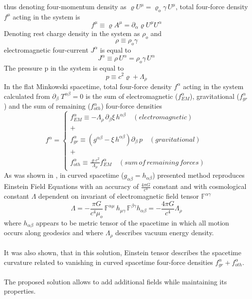 \documentclass[aps,prx,preprint,groupedaddress,showkeys]{revtex4-2}
\begin{document}
thus denoting four-momentum density as $\varrho U^{\mu} = \varrho_o \gamma \, U^{\mu}$, total four-force density $f^{\mu}$ acting in the system is
\begin{equation} \label{TotFoI}
f^{\mu} \equiv \varrho A^{\mu} = \partial_{\alpha} \varrho U^{\mu} U^{\alpha}
\end{equation}
Denoting rest charge density in the system as $ \rho_o$ and
\begin{equation} \label{RHZERO}
\rho \equiv \rho_o \gamma
\end{equation}
electromagnetic four-current $J^{\alpha}$ is equal to
\begin{equation} \label{EN11}
J^{\alpha} \equiv \rho \, U^{\alpha} = \rho_o \gamma \, U^{\alpha}
\end{equation}
The pressure p in the system is equal to
\begin{equation} \label{Pressure}
p \equiv c^2 \varrho +  \Lambda_{\rho}
\end{equation}
In the flat Minkowski spacetime, total four-force density $f^{\alpha}$ acting in the system calculated from $\partial_{\beta} \; T^{\alpha \beta} =0$ is the sum of electromagnetic ($f^{\alpha}_{EM}$), gravitational ($f^{\alpha}_{gr}$) and the sum of remaining ($f^{\alpha}_{oth}$) four-force densities
\begin{equation} \label{forceDen}
f^{\alpha} = 
\begin{cases} 
f^{\alpha}_{EM} \equiv -\Lambda_{\rho} \, \partial_{\beta} \xi \, h^{\alpha \beta} \quad (electromagnetic) \\
+ \\
f^{\alpha}_{gr} \equiv \left ( g^{\alpha \beta} - \xi \, h^{\alpha \beta}  \right ) \partial_{\beta} \, p \quad (gravitational) \\
+ \\
f^{\alpha}_{oth} \equiv \frac{\varrho c^2}{\Lambda_{\rho}} f^{\alpha}_{EM}  \quad (sum \, of\, remaining \, forces)
\end{cases}
\end{equation}
As was shown in \cite{PMofC}, in curved spacetime ($g_{\alpha \beta} =h_{\alpha \beta}$) presented method reproduces Einstein Field Equations with an accuracy of $\frac{4\pi G}{c^4}$ constant and with cosmological constant $\Lambda$ dependent on invariant of electromagnetic field tensor $\mathbb{F}^{\alpha \gamma}$
\begin{equation} \label{CosmoCon}
\Lambda =  - \frac{\pi G}{c^4 \mu_o} \, \mathbb{F}^{\alpha \mu} \, h_{\mu \gamma} \, \mathbb{F}^{ \beta \gamma } h_{\alpha \beta} = - \frac{4\pi G}{c^4} \Lambda_{\rho}
\end{equation}
where $h_{\alpha \beta}$ appears to be metric tensor of the spacetime in which all motion occurs along geodesics and where $\Lambda_{\rho}$ describes vacuum energy density.\\
~\\
It was also shown, that in this solution, Einstein tensor describes the spacetime curvature related to vanishing in curved spacetime four-force densities $f^{\alpha}_{gr} + f^{\alpha}_{oth}$.\\
~\\
The proposed solution allows to add additional fields while maintaining its properties.
\end{document}
